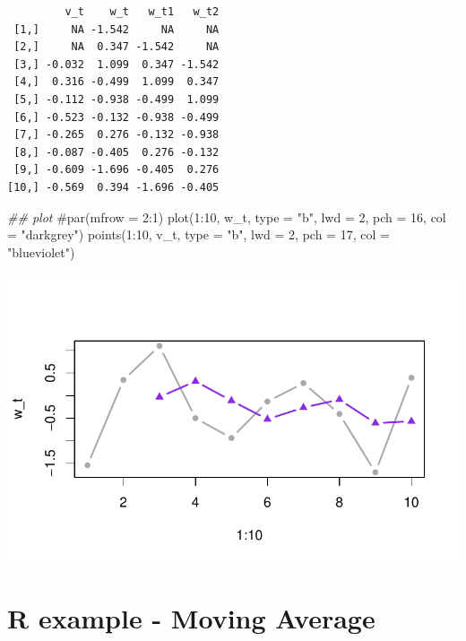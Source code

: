 \documentclass[
  letterpaper,
  DIV=11,
  numbers=noendperiod]{scrreprt}
\newenvironment{Shaded}{\begin{snugshade}}{\end{snugshade}}
\newcommand{\AttributeTok}[1]{\textcolor[rgb]{0.40,0.45,0.13}{#1}}
\newcommand{\CommentTok}[1]{\textcolor[rgb]{0.37,0.37,0.37}{#1}}
\newcommand{\DecValTok}[1]{\textcolor[rgb]{0.68,0.00,0.00}{#1}}
\newcommand{\DocumentationTok}[1]{\textcolor[rgb]{0.37,0.37,0.37}{\textit{#1}}}
\newcommand{\FunctionTok}[1]{\textcolor[rgb]{0.28,0.35,0.67}{#1}}
\newcommand{\NormalTok}[1]{\textcolor[rgb]{0.00,0.23,0.31}{#1}}
\newcommand{\SpecialCharTok}[1]{\textcolor[rgb]{0.37,0.37,0.37}{#1}}
\newcommand{\StringTok}[1]{\textcolor[rgb]{0.13,0.47,0.30}{#1}}
\begin{document}
\begin{verbatim}
         v_t    w_t   w_t1   w_t2
 [1,]     NA -1.542     NA     NA
 [2,]     NA  0.347 -1.542     NA
 [3,] -0.032  1.099  0.347 -1.542
 [4,]  0.316 -0.499  1.099  0.347
 [5,] -0.112 -0.938 -0.499  1.099
 [6,] -0.523 -0.132 -0.938 -0.499
 [7,] -0.265  0.276 -0.132 -0.938
 [8,] -0.087 -0.405  0.276 -0.132
 [9,] -0.609 -1.696 -0.405  0.276
[10,] -0.569  0.394 -1.696 -0.405
\end{verbatim}

\begin{Shaded}
\begin{Highlighting}[]
\DocumentationTok{\#\# plot}
\CommentTok{\#par(mfrow = 2:1)}
\FunctionTok{plot}\NormalTok{(}\DecValTok{1}\SpecialCharTok{:}\DecValTok{10}\NormalTok{, w\_t, }\AttributeTok{type =} \StringTok{"b"}\NormalTok{, }\AttributeTok{lwd =} \DecValTok{2}\NormalTok{, }\AttributeTok{pch =} \DecValTok{16}\NormalTok{, }\AttributeTok{col =} \StringTok{"darkgrey"}\NormalTok{)}
\FunctionTok{points}\NormalTok{(}\DecValTok{1}\SpecialCharTok{:}\DecValTok{10}\NormalTok{, v\_t, }\AttributeTok{type =} \StringTok{"b"}\NormalTok{, }\AttributeTok{lwd =} \DecValTok{2}\NormalTok{, }\AttributeTok{pch =} \DecValTok{17}\NormalTok{, }\AttributeTok{col =} \StringTok{"blueviolet"}\NormalTok{)}
\end{Highlighting}
\end{Shaded}

\includegraphics{LectureNotes/Lecture2_files/figure-pdf/unnamed-chunk-5-1.pdf}

\section{R example - Moving Average}\label{r-example---moving-average-1}
\end{document}
